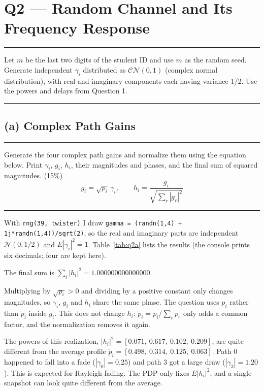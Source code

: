 \documentclass[12pt,a4paper]{report}
\newcommand{\question}[1]{%
    \hrule
    \vspace{0.2cm}
    #1
    \vspace{0.2cm}
    \hrule
    \vspace{0.5cm}
}
\begin{document}
\newpage

\chapter{Q2 — Random Channel and Its Frequency Response}
\question{Let $m$ be the last two digits of the student ID and use $m$ as the random seed. Generate independent
$\gamma_i$ distributed as $\mathcal{CN}(0,1)$ (complex normal distribution), with real and imaginary components each
having variance 1/2. Use the powers and delays from Question 1.}

\section{(a) Complex Path Gains}

\question{Generate the four complex path gains and normalize them using the equation below. Print $\gamma_i$, $g_i$,
$h_i$, their magnitudes and phases, and the final sum of squared magnitudes. (15\%)
\[ g_i = \sqrt{p_i}\,\gamma_i, \qquad h_i = \frac{g_i}{\sqrt{\sum_r |g_r|^2}} \]}

With \texttt{rng(39, \textquotesingle twister\textquotesingle)} I draw \texttt{gamma = (randn(1,4) + 1j*randn(1,4))/sqrt(2)}, so the real and
imaginary parts are independent $\mathcal{N}(0, 1/2)$ and $E|\gamma_i|^2 = 1$. Table~\ref{tab:q2a} lists the results
(the console prints six decimals; four are kept here).

\begin{table}[H]
\centering
\caption{Path Gains $\gamma_i$, $g_i$ and $h_i$ with Their Magnitudes and Phases}
\label{tab:q2a}
\setlength{\tabcolsep}{3pt}
\renewcommand{\arraystretch}{1.25}
\footnotesize

\end{table}

The final sum is $\sum_i |h_i|^2 = 1.000000000000000$.

Multiplying by $\sqrt{p_i} > 0$ and dividing by a positive constant only changes magnitudes, so $\gamma_i$, $g_i$ and
$h_i$ share the same phase. The question uses $p_i$ rather than $\tilde p_i$ inside $g_i$. This does not change $h_i$:
$\tilde p_i = p_i/\sum_r p_r$ only adds a common factor, and the normalization removes it again.

The powers of this realization, $|h_i|^2 = [0.071,\ 0.617,\ 0.102,\ 0.209]$, are quite different from the average
profile $\tilde p_i = [0.498,\ 0.314,\ 0.125,\ 0.063]$. Path 0 happened to fall into a fade ($|\gamma_0| = 0.25$) and
path 3 got a large draw ($|\gamma_3| = 1.20$). This is expected for Rayleigh fading. The PDP only fixes $E|h_i|^2$,
and a single snapshot can look quite different from the average.
\end{document}
